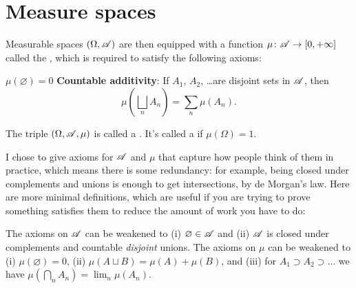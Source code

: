 \section{Measure spaces}
\begin{definition}
	Measurable spaces $(\Omega, \mathscr A)$ are then equipped
	with a function $\mu \colon \mathscr A \to [0, +\infty]$
	called the , which is required to satisfy
	the following axioms:
	\begin{itemize}
		\ii $\mu(\varnothing) = 0$
		\ii \textbf{Countable additivity}:
		If $A_1$, $A_2$, \dots are disjoint sets in $\mathscr A$,
		then \[ \mu\left( \bigsqcup_n A_n \right) = \sum_n \mu(A_n). \]
	\end{itemize}
	The triple $(\Omega, \mathscr A, \mu)$ is called a .
	It's called a  if $\mu(\Omega) = 1$.
\end{definition}
\begin{exercise}
	I chose to give axioms for $\mathscr A$ and $\mu$
	that capture how people think of them in practice,
	which means there is some redundancy:
	for example, being closed under complements and unions
	is enough to get intersections, by de Morgan's law.
	Here are more minimal definitions,
	which are useful if you are trying to prove something satisfies them
	to reduce the amount of work you have to do:
	\begin{enumerate}[(a)]
		\ii The axioms on $\mathscr A$ can be weakened
		to (i) $\varnothing \in \mathscr A$ and (ii) $\mathscr A$ is closed under
		complements and countable \emph{disjoint} unions.
		\ii The axioms on $\mu$ can be weakened to
		(i) $\mu(\varnothing) = 0$,
		(ii) $\mu(A \sqcup B) = \mu(A) + \mu(B)$, and
		(iii) for $A_1 \supset A_2 \supset \dots$
		we have $\mu\left( \bigcap_n A_n \right) = \lim_n \mu(A_n)$.
	\end{enumerate}
\end{exercise}


